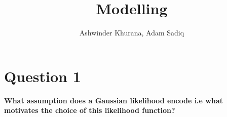 \documentclass[preprint,12pt]{elsarticle}
\begin{document}
\begin{frontmatter}


\title{Modelling}




\author{Ashwinder Khurana, Adam Sadiq }

\address{Bristol, United Kingdom}


\end{frontmatter}






\section{Question 1}

\textbf{What assumption does a Gaussian likelihood encode i.e what motivates the choice of this likelihood function?}
\end{document}
